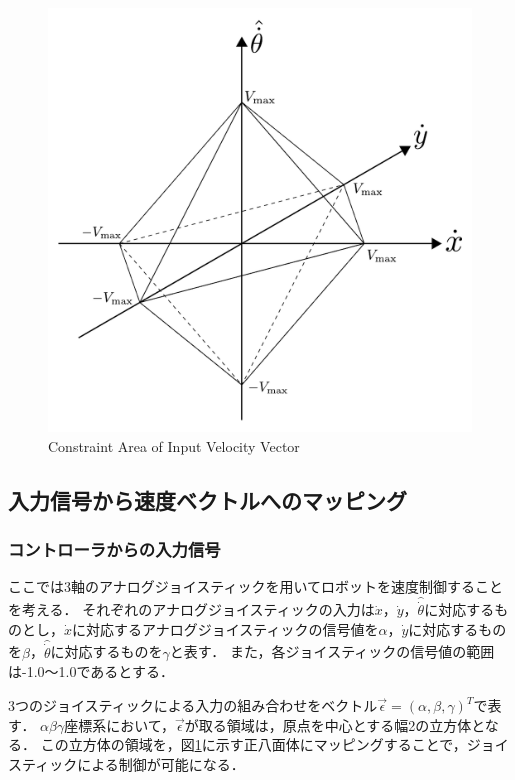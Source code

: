 \documentclass[../master]{subfiles}
\begin{document}
  \begin{figure}[h]
    \centering
    \includegraphics[width=80truemm, clip]{images/constraint.pdf}
    \caption{Constraint Area of Input Velocity Vector}
    \label{fig:constraint}
  \end{figure}

  \subsection{入力信号から速度ベクトルへのマッピング}

  \subsubsection{コントローラからの入力信号}

  ここでは3軸のアナログジョイスティックを用いてロボットを速度制御することを考える．
  それぞれのアナログジョイスティックの入力は$\dot{x}$，$\dot{y}$，$\hat{\dot{\theta}}$に対応するものとし，$\dot{x}$に対応するアナログジョイスティックの信号値を$\alpha$，$\dot{y}$に対応するものを$\beta$，$\hat{\dot{\theta}}$に対応するものを$\gamma$と表す．
  また，各ジョイスティックの信号値の範囲は-1.0～1.0であるとする．

  3つのジョイスティックによる入力の組み合わせをベクトル$\vec{\epsilon} = (\alpha, \beta, \gamma)^T$で表す．
  $\alpha\beta\gamma$座標系において，$\vec{\epsilon}$が取る領域は，原点を中心とする幅2の立方体となる．
  この立方体の領域を，図\ref{fig:constraint}に示す正八面体にマッピングすることで，ジョイスティックによる制御が可能になる．
\end{document}
